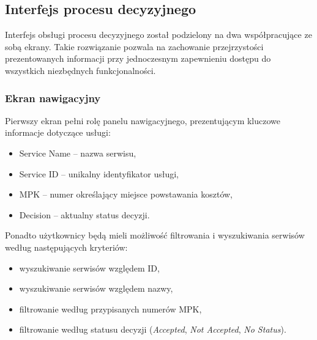 \subsection{Interfejs procesu decyzyjnego}
Interfejs obsługi procesu decyzyjnego został podzielony na dwa współpracujące ze sobą ekrany. Takie rozwiązanie pozwala na zachowanie przejrzystości prezentowanych informacji przy jednoczesnym zapewnieniu dostępu do wszystkich niezbędnych funkcjonalności.

\subsubsection*{Ekran nawigacyjny}
Pierwszy ekran pełni rolę panelu nawigacyjnego, prezentującym kluczowe informacje dotyczące usługi:
\begin{itemize}
    \item Service Name -- nazwa serwisu,
    \item Service ID -- unikalny identyfikator usługi,
    \item MPK -- numer określający miejsce powstawania kosztów,
    \item Decision -- aktualny status decyzji.
\end{itemize}
Ponadto użytkownicy będą mieli możliwość filtrowania i wyszukiwania serwisów według następujących kryteriów:
\begin{itemize}
    \item wyszukiwanie serwisów względem ID,
    \item wyszukiwanie serwisów względem nazwy,
    \item filtrowanie według przypisanych numerów MPK,
    \item filtrowanie według statusu decyzji (\emph{Accepted}, \emph{Not Accepted}, \emph{No Status}).
\end{itemize}

